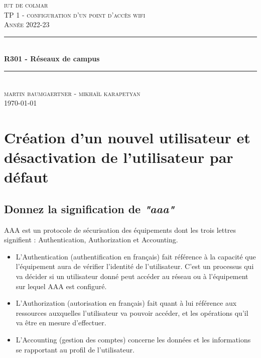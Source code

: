 \documentclass[12pt, a4paper]{article}
\begin{document}
\begin{titlepage}
	\newcommand{\HRule}{\rule{\linewidth}{0.5mm}} 
	\center 
	\textsc{\LARGE iut de colmar}\\[6.5cm] 
	\textsc{\Large TP 1 - configuration d'un point d'accès wifi}\\[0.5cm] 
	\textsc{\large Année 2022-23}\\[0.5cm]
	\HRule\\[0.75cm]
	{\huge\bfseries R301 - Réseaux de campus}\\[0.4cm]
	\HRule\\[1.5cm]
	\textsc{\large martin baumgaertner - mikhaïl karapetyan}\\[6.5cm] 

	\vfill\vfill\vfill
	{\large\today} 
	\vfill
\end{titlepage}
\newpage
\tableofcontents
\listoffigures
\listoflistings
\newpage
\section{Création d'un nouvel utilisateur et désactivation de l'utilisateur par défaut}
    \subsection{Donnez la signification de \textit{"aaa"}}
    AAA est un protocole de sécurisation des équipements dont les trois lettres signifient : Authentication, Authorization et Accounting.\\
    \begin{itemize}
        \item L’Authentication (authentification en français) fait référence à la capacité que l’équipement aura de vérifier l’identité de l’utilisateur. C’est un processus qui va décider si un utilisateur donné peut accéder au réseau ou à l’équipement sur lequel AAA est configuré.\\
        \item L’Authorization (autorisation en français) fait quant à lui référence aux ressources auxquelles l’utilisateur va pouvoir accéder, et les opérations qu’il va être en mesure d’effectuer.\\
        \item L’Accounting (gestion des comptes) concerne les données et les informations se rapportant au profil de l’utilisateur.\\
    \end{itemize}
\end{document}
